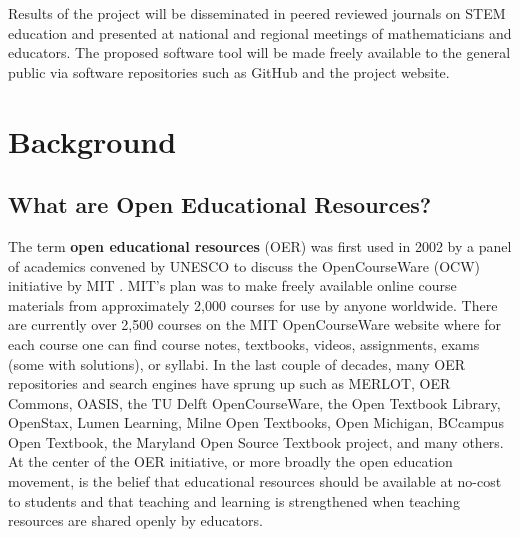 \documentclass[11pt]{article}
\begin{document}
Results of the project will be disseminated in peered reviewed journals on STEM education and presented at national and regional meetings of mathematicians and educators.  The proposed software tool will be made freely available to the general public via software repositories such as GitHub and the project website.

\section{Background}

\subsection{What are Open Educational Resources?}
The term \textbf{open educational resources} (OER) was first used in 2002 by a panel of academics convened by UNESCO to discuss the OpenCourseWare (OCW) initiative by MIT \cite{unescoforum:02, oerguidelines}.  MIT's plan was to make freely available online course materials from approximately 2,000 courses for use by anyone worldwide.  There are currently over 2,500 courses on the MIT OpenCourseWare website where for each course one can find course notes, textbooks, videos, assignments, exams (some with solutions), or syllabi.  In the last couple of decades, many OER repositories and search engines have sprung up such as MERLOT, OER Commons, OASIS, the TU Delft OpenCourseWare, the Open Textbook Library, OpenStax, Lumen Learning, Milne Open Textbooks, Open Michigan, BCcampus Open Textbook, the Maryland Open Source Textbook project, and many others.  At the center of the OER initiative, or more broadly the open education movement, is the belief that educational resources should be available at no-cost to students and that teaching and learning is strengthened when teaching resources are shared openly by educators.
\end{document}
